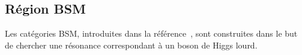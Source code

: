 \subsection{Région \og BSM \fg{}}\label{chapter-HTT_analysis-section-categorisation-BSM}
Les catégories BSM, introduites dans la référence~\cite{CMS-PAS-HIG-17-020}, sont construites dans le but de chercher une résonance correspondant à un boson de Higgs lourd.
